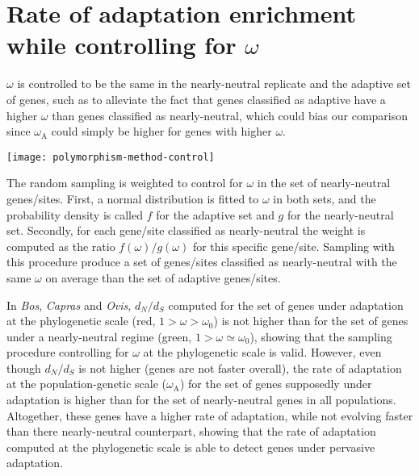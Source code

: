 \documentclass{article}
\renewcommand*{\bm}[1]{#1}%
\newcommand{\dn}{d_N}
\newcommand{\ds}{d_S}
\newcommand{\dnds}{\dn / \ds}
\newcommand{\rateApop}{\omega_{\mathrm{A}}}
\begin{document}
    \pagebreak


    \section{Rate of adaptation enrichment while controlling for $\bm{\omega}$}
    \label{sec:controlling-for-omega}

    $\omega$ is controlled to be the same in the nearly-neutral replicate and the adaptive set of genes, such as to alleviate the fact that genes classified as adaptive have a higher $\omega$ than genes classified as nearly-neutral, which could bias our comparison since $\rateApop$ could simply be higher for genes with higher $\omega$.

    \begin{center}
        \texttt{[image: polymorphism-method-control]}
    \end{center}

    The random sampling is weighted to control for $\omega$ in the set of nearly-neutral genes/sites.
    First, a normal distribution is fitted to $\omega$ in both sets, and the probability density is called $f$ for the adaptive set and $g$ for the nearly-neutral set.
    Secondly, for each gene/site classified as nearly-neutral the weight is computed as the ratio $f(\omega)/g(\omega)$ for this specific gene/site.
    Sampling with this procedure produce a set of genes/sites classified as nearly-neutral with the same $\omega$ on average than the set of adaptive genes/sites.
    \newpage
    

    In \textit{Bos}, \textit{Capras} and \textit{Ovis}, $\dnds$ computed for the set of genes under adaptation at the phylogenetic scale (red, $1 > \omega > \omega_{0}$) is not higher than for the set of genes under a nearly-neutral regime (green, $1 > \omega \simeq \omega_{0}$), showing that the sampling procedure controlling for $\omega$ at the phylogenetic scale is valid.
    However, even though $\dnds$ is not higher (genes are not faster overall), the rate of adaptation at the population-genetic scale ($\rateApop$) for the set of genes supposedly under adaptation is higher than for the set of nearly-neutral genes in all populations.
    Altogether, these genes have a higher rate of adaptation, while not evolving faster than there nearly-neutral counterpart, showing that the rate of adaptation computed at the phylogenetic scale is able to detect genes under pervasive adaptation.
\end{document}

